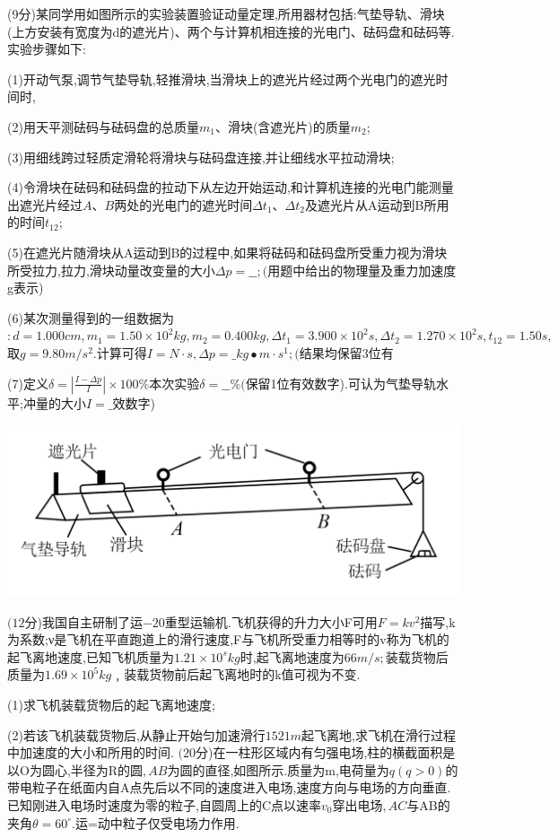 \question[6] (9分)某同学用如图所示的实验装置验证动量定理,所用器材包括:气垫导轨、滑块(上方安装有宽度为d的遮光片)、两个与计算机相连接的光电门、砝码盘和砝码等.实验步骤如下:

(1)开动气泵,调节气垫导轨,轻推滑块,当滑块上的遮光片经过两个光电门的遮光时间时,

(2)用天平测砝码与砝码盘的总质量$m_1、$滑块(含遮光片)的质量$m_2$;

(3)用细线跨过轻质定滑轮将滑块与砝码盘连接,并让细线水平拉动滑块;

(4)令滑块在砝码和砝码盘的拉动下从左边开始运动,和计算机连接的光电门能测量出遮光片经过$A、B$两处的光电门的遮光时间$Δt_1、Δt_2$及遮光片从A运动到B所用的时间$t_12$;

(5)在遮光片随滑块从A运动到B的过程中,如果将砝码和砝码盘所受重力视为滑块所受拉力,拉力,滑块动量改变量的大小$Δp=\_\_;($用题中给出的物理量及重力加速度g表示)

(6)某次测量得到的一组数据为$:d=1.000cm,m_1=1.50×10^2kg,m_2=0.400kg,Δt_1=3.900×10^2s,Δt_2=1.270×10^2s,t_12=1.50s,$取$g=9.80m/s^2.$计算可得$I=N·s,Δp=\_kg∙m·s^1;($结果均保留3位有

(7)定义$\delta=|\frac{I-\Delta p}{I}|\times 100\%$本次实验$δ=\_\_\%($保留1位有效数字).可认为气垫导轨水平;冲量的大小$I=\_$效数字)
\begin{center}
\includegraphics[]{img/image8.png}
\end{center}

\question[6] $(12$分)我国自主研制了运$-20$重型运输机.飞机获得的升力大小F可用$F=kv^2$描写,k为系数;ν是飞机在平直跑道上的滑行速度,F与飞机所受重力相等时的v称为飞机的起飞离地速度,已知飞机质量为$1.21×10^skg$时,起飞离地速度为$66m/s;$装载货物后质量为$1.69×10^5kg﹐$装载货物前后起飞离地时的k值可视为不变.

(1)求飞机装载货物后的起飞离地速度;

(2)若该飞机装载货物后,从静止开始匀加速滑行$1521m$起飞离地,求飞机在滑行过程中加速度的大小和所用的时间.
\question[6] $(20$分)在一柱形区域内有匀强电场,柱的横截面积是以O为圆心,半径为R的圆$,AB$为圆的直径,如图所示.质量为m,电荷量为$q(q>0)$的带电粒子在纸面内自A点先后以不同的速度进入电场,速度方向与电场的方向垂直.已知刚进入电场时速度为零的粒子,自圆周上的C点以速率$v_0$穿出电场$,AC$与AB的夹角$θ=60^∘.$运=动中粒子仅受电场力作用.

